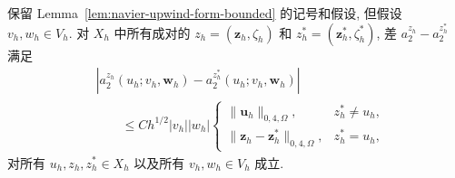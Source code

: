 \setcounter{statement}{2}
\begin{Lemma}\label{lem:navier-upwind-boundary-almost-lipschitz}
保留 Lemma~\ref{lem:navier-upwind-form-bounded} 的记号和假设, 但假设
$v_h,w_h\in V_h$. 对 $X_h$ 中所有成对的
$z_h=(\boldsymbol z_h,\zeta_h)$ 和
$z_h^*=(\boldsymbol z_h^*,\zeta_h^*)$, 差
$a_2^{z_h}-a_2^{z_h^*}$ 满足
\begin{equation}\label{eq:navier-upwind-boundary-almost-lipschitz}
\begin{aligned}
&|a_2^{z_h}(u_h;v_h,\boldsymbol w_h)
-a_2^{z_h^*}(u_h;v_h,\boldsymbol w_h)|\\
&\qquad\leq Ch^{1/2}|v_h||w_h|
\begin{cases}
\|\boldsymbol u_h\|_{0,4,\Omega},&z_h^*\neq u_h,\\
\|\boldsymbol z_h-\boldsymbol z_h^*\|_{0,4,\Omega},&z_h^*=u_h,
\end{cases}
\end{aligned}
\end{equation}
对所有 $u_h,z_h,z_h^*\in X_h$ 以及所有 $v_h,w_h\in V_h$ 成立.
\end{Lemma}
